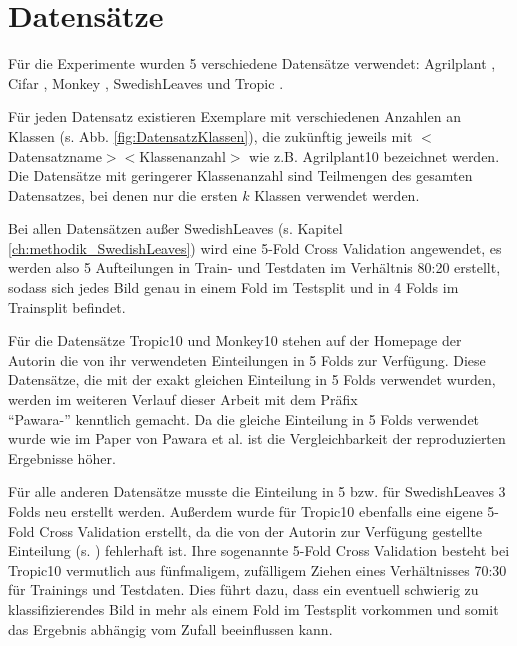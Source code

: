 \newpage
\section{Datensätze}
\label{ch:methodik_datensaetze}
Für die Experimente wurden 5 verschiedene Datensätze verwendet: Agrilplant \cite{pawaraWebsiteDatensaetze}, Cifar \cite{cifar10}, Monkey \cite{pawaraWebsiteDatensaetze}, SwedishLeaves \cite{swedishLeaves} und Tropic \cite{pawaraWebsiteDatensaetze}.

Für jeden Datensatz existieren Exemplare mit verschiedenen Anzahlen an Klassen (s. Abb. \ref{fig:DatensatzKlassen}), die zukünftig jeweils mit $<$Datensatzname$><$Klassenanzahl$>$ wie z.B. Agrilplant10 bezeichnet werden.
Die Datensätze mit geringerer Klassenanzahl sind Teilmengen des gesamten Datensatzes, bei denen nur die ersten $k$ Klassen verwendet werden.

Bei allen Datensätzen außer SwedishLeaves (s. Kapitel \ref{ch:methodik_SwedishLeaves}) wird eine 5-Fold Cross Validation angewendet, es werden also 5 Aufteilungen in Train- und Testdaten im Verhältnis 80:20 erstellt, sodass sich jedes Bild genau in einem Fold im Testsplit und in 4 Folds im Trainsplit befindet.

Für die Datensätze Tropic10 und Monkey10 stehen auf der Homepage der Autorin \cite{pawaraWebsiteDatensaetze} die von ihr verwendeten Einteilungen in 5 Folds zur Verfügung. Diese Datensätze, die mit der exakt gleichen Einteilung in 5 Folds verwendet wurden, werden im weiteren Verlauf dieser Arbeit mit dem Präfix\\ \enquote{Pawara-} kenntlich gemacht. Da die gleiche Einteilung in 5 Folds verwendet wurde wie im Paper von Pawara et al. \cite{pawaraPaper} ist die Vergleichbarkeit der reproduzierten Ergebnisse höher.

Für alle anderen Datensätze musste die Einteilung in 5 bzw. für SwedishLeaves 3 Folds neu erstellt werden.
Außerdem wurde für Tropic10 ebenfalls eine eigene 5-Fold Cross Validation erstellt, da die von der Autorin zur Verfügung gestellte Einteilung (s. \cite{pawaraWebsiteDatensaetze}) fehlerhaft ist. Ihre sogenannte 5-Fold Cross Validation besteht bei Tropic10 vermutlich aus fünfmaligem, zufälligem Ziehen eines Verhältnisses 70:30 für Trainings und Testdaten. Dies führt dazu, dass ein eventuell schwierig zu klassifizierendes Bild in mehr als einem Fold im Testsplit vorkommen und somit das Ergebnis abhängig vom Zufall beeinflussen kann.

